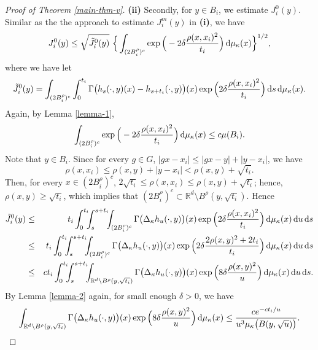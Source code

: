 \documentclass[11pt,a4paper]{article}
\def\R{\mathbb{R}}
\def\d{\textup{d}}
\theoremstyle{definition}\newtheorem{remark}[theorem]{Remark}
\begin{document}
\begin{proof}[Proof of Theorem \ref{main-thm-v}]
\textbf{(ii)} Secondly, for $y\in B_i$, we estimate $J_i^0(y)$. Similar as the the approach to estimate $J_i^m(y)$ in \textbf{(i)}, we have
\begin{eqnarray*}
J_i^0(y)\leq\sqrt{\tilde{J}_i^0(y)}~\Big\{\int_{(2B_i^\rho)^c} \exp\Big(-2\delta\frac{\rho(x,x_i)^2}{t_i}\Big)\,\d\mu_\kappa(x)\Big\}^{1/2},
\end{eqnarray*}
where  we have let
\begin{eqnarray*}
\tilde{J}_i^0(y)=\int_{(2B_i^\rho)^c}\int_{0}^{t_i}\Gamma\big( h_s(\cdot,y)(x)- h_{s+t_i}(\cdot,y)\big)(x)\exp\Big(2\delta\frac{\rho(x,x_i)^2}{t_i}\Big)\,\d s\,\d\mu_\kappa(x).
\end{eqnarray*}
Again, by Lemma \ref{lemma-1},
\begin{eqnarray*}\label{proof-main-3-5}
\int_{(2B_i^\rho)^c} \exp\Big(-2\delta\frac{\rho(x,x_i)^2}{t_i}\Big)\,\d\mu_\kappa(x)\leq c\mu(B_i).
\end{eqnarray*}
Note that $y\in B_i$. Since for every $g\in G$, $|gx-x_i|\leq|gx-y|+|y-x_i|$, we have
$$\rho(x,x_i)\leq\rho(x,y)+|y-x_i|<\rho(x,y)+\sqrt{t_i}.$$
Then, for every $x\in(2B_i^\rho)^c$, $2\sqrt{t_i}\leq\rho(x,x_i)\leq\rho(x,y)+\sqrt{t_i}$; hence, $\rho(x,y)\geq\sqrt{t_i}$, which implies that $(2B_i^\rho)^c\subset\R^d\setminus B^\rho(y,\sqrt{t_i}).$ Hence
\begin{eqnarray*}
\tilde{J}_i^0(y)&\leq& t_i\int_0^{t_i}\!\!\!\int_{s}^{s+t_i}\!\!\!\int_{(2B_i^\rho)^c}\Gamma\big(\Delta_\kappa h_u(\cdot,y)\big)(x)\exp\Big(2\delta\frac{\rho(x,x_i)^2}{t_i}\Big)\,\d\mu_\kappa(x)\,\d u\,\d s\\
&\leq& t_i\int_0^{t_i}\!\!\!\int_{s}^{s+t_i}\!\!\!\int_{(2B_i^\rho)^c}\Gamma\big(\Delta_\kappa h_u(\cdot,y)\big)(x)\exp\Big(2\delta\frac{2\rho(x,y)^2+2t_i}{t_i}\Big)\,\d\mu_\kappa(x)\,\d u\,\d s\\
&\leq&ct_i\int_0^{t_i}\!\!\!\int_{s}^{s+t_i}\!\!\!\int_{\R^d\setminus B^\rho(y,\sqrt{t_i})}\Gamma\big(\Delta_\kappa h_u(\cdot,y)\big)(x)\exp\Big(8\delta\frac{\rho(x,y)^2}{u}\Big)\,\d\mu_\kappa(x)\,\d u\,\d s.
\end{eqnarray*}
By Lemma \ref{lemma-2} again, for small enough $\delta>0$, we have
$$\int_{\R^d\setminus B^\rho(y,\sqrt{t_i})}\Gamma\big(\Delta_\kappa h_u(\cdot,y)\big)(x)\exp\Big(8\delta\frac{\rho(x,y)^2}{u}\Big)\,\d\mu_\kappa(x)
\leq\frac{ce^{-ct_i/u}}{u^3\mu_\kappa\big(B(y,\sqrt{u})\big)}.$$

\end{proof}
\end{document}
